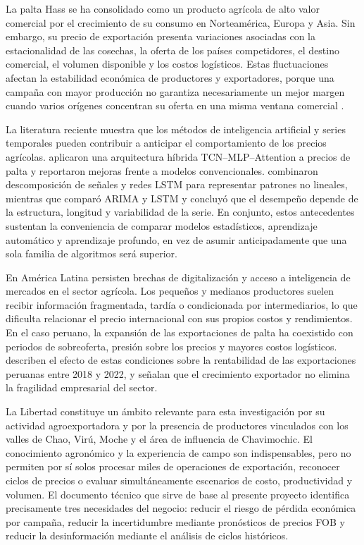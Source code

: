 La palta Hass se ha consolidado como un producto agrícola de alto valor comercial por el crecimiento de su consumo en Norteamérica, Europa y Asia. Sin embargo, su precio de exportación presenta variaciones asociadas con la estacionalidad de las cosechas, la oferta de los países competidores, el destino comercial, el volumen disponible y los costos logísticos. Estas fluctuaciones afectan la estabilidad económica de productores y exportadores, porque una campaña con mayor producción no garantiza necesariamente un mejor margen cuando varios orígenes concentran su oferta en una misma ventana comercial \citep{ADEX2023, Velasquez2025, Zhang2025}.

La literatura reciente muestra que los métodos de inteligencia artificial y series temporales pueden contribuir a anticipar el comportamiento de los precios agrícolas. \citet{Zhang2025} aplicaron una arquitectura híbrida TCN--MLP--Attention a precios de palta y reportaron mejoras frente a modelos convencionales. \citet{Chen2023} combinaron descomposición de señales y redes LSTM para representar patrones no lineales, mientras que \citet{Xia2024} comparó ARIMA y LSTM y concluyó que el desempeño depende de la estructura, longitud y variabilidad de la serie. En conjunto, estos antecedentes sustentan la conveniencia de comparar modelos estadísticos, aprendizaje automático y aprendizaje profundo, en vez de asumir anticipadamente que una sola familia de algoritmos será superior.

En América Latina persisten brechas de digitalización y acceso a inteligencia de mercados en el sector agrícola. Los pequeños y medianos productores suelen recibir información fragmentada, tardía o condicionada por intermediarios, lo que dificulta relacionar el precio internacional con sus propios costos y rendimientos. En el caso peruano, la expansión de las exportaciones de palta ha coexistido con periodos de sobreoferta, presión sobre los precios y mayores costos logísticos. \citet{Capunay2025} describen el efecto de estas condiciones sobre la rentabilidad de las exportaciones peruanas entre 2018 y 2022, y \citet{Pantaleon2024} señalan que el crecimiento exportador no elimina la fragilidad empresarial del sector.

La Libertad constituye un ámbito relevante para esta investigación por su actividad agroexportadora y por la presencia de productores vinculados con los valles de Chao, Virú, Moche y el área de influencia de Chavimochic. El conocimiento agronómico y la experiencia de campo son indispensables, pero no permiten por sí solos procesar miles de operaciones de exportación, reconocer ciclos de precios o evaluar simultáneamente escenarios de costo, productividad y volumen. El documento técnico que sirve de base al presente proyecto identifica precisamente tres necesidades del negocio: reducir el riesgo de pérdida económica por campaña, reducir la incertidumbre mediante pronósticos de precios FOB y reducir la desinformación mediante el análisis de ciclos históricos.


